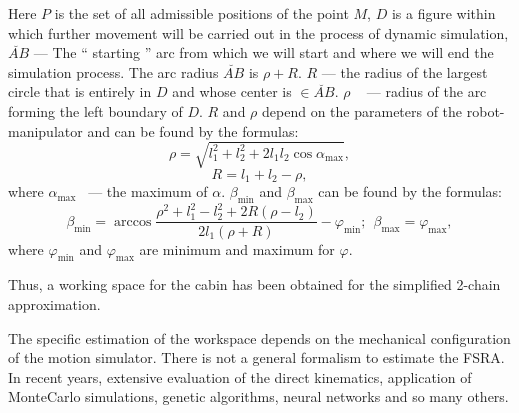 \documentclass[journal,twocolumn]{IEEEtran}
\begin{document}
Here $ P $ is the set of all admissible positions of the point $ M $, $ D $ is a figure within which further movement will be carried out in the process of dynamic simulation, $ \breve {AB} $ --- The `` starting '' arc from which we will start and where we will end the simulation process. The arc radius $ \breve {AB} $ is $ \rho + R $. $ R $ --- the radius of the largest circle that is entirely in $ D $ and whose center is $ \in \breve {AB} $. $ \rho $ ~ --- radius of the arc forming the left boundary of $ D $. $ R $ and $ \rho $ depend on the parameters of the robot-manipulator and can be found by the formulas:
\begin{equation*}
    \rho = \sqrt{l_1^2+l_2^2+2l_1l_2\cos\alpha_{\max}},
\end{equation*}
\begin{equation*}
    R = l_1 + l_2 - \rho,
\end{equation*}
where $\alpha_{\max}$ ~--- the maximum of $\alpha$.
 $\beta_{\min}$ and $\beta_{\max}$ can be found by the formulas:
\begin{equation*}
    \beta_{\min} = \arccos\frac{\rho^2+l_1^2-l_2^2+2R(\rho-l_2)}{2l_1(\rho+R)}-\varphi_{\min};\ \
    \beta_{\max} = \varphi_{\max},
\end{equation*}
where $\varphi_{\min}$ and $\varphi_{\max}$ are minimum and maximum for $\varphi$.

Thus, a working space for the cabin has been obtained for the simplified 2-chain approximation.

The specific estimation of the workspace depends on the mechanical configuration of the motion simulator. There is not a general formalism to estimate the FSRA. In recent years, extensive evaluation of the direct kinematics, application of MonteCarlo simulations, genetic algorithms, neural networks and so many others. 
\end{document}
